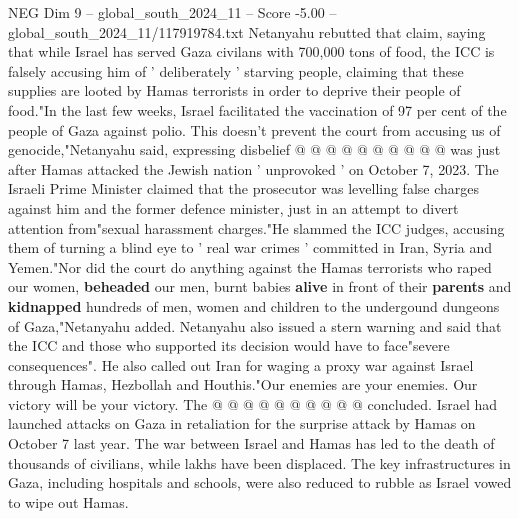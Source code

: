 \begin{textsample}{NEG Dim 9 – global\_south\_2024\_11 – Score -5.00 – global\_south\_2024\_11/117919784.txt}
Netanyahu rebutted that claim, saying that while Israel has served Gaza civilans with 700,000 tons of food, the ICC is falsely accusing him of ' deliberately ' starving people, claiming that these supplies are looted by Hamas terrorists in order to deprive their people of food."In the last few weeks, Israel facilitated the vaccination of 97 per cent of the people of Gaza against polio.
This doesn't prevent the court from accusing us of genocide,"Netanyahu said, expressing disbelief @ @ @ @ @ @ @ @ @ @ was just after Hamas attacked the Jewish nation ' unprovoked ' on October 7, 2023.
The Israeli Prime Minister claimed that the prosecutor was levelling false charges against him and the former defence minister, just in an attempt to divert attention from"sexual harassment charges."He slammed the ICC judges, accusing them of turning a blind eye to ' real war crimes ' committed in Iran, Syria and Yemen."Nor did the court do anything against the Hamas terrorists who raped our women, \textbf{beheaded} our men, burnt babies \textbf{alive} in front of their \textbf{parents} and \textbf{kidnapped} hundreds of men, women and children to the undergound dungeons of Gaza,"Netanyahu added.
Netanyahu also issued a stern warning and said that the ICC and those who supported its decision would have to face"severe consequences".
He also called out Iran for waging a proxy war against Israel through Hamas, Hezbollah and Houthis."Our enemies are your enemies.
Our victory will be your victory.
The @ @ @ @ @ @ @ @ @ @ concluded.
Israel had launched attacks on Gaza in retaliation for the surprise attack by Hamas on October 7 last year.
The war between Israel and Hamas has led to the death of thousands of civilians, while lakhs have been displaced.
The key infrastructures in Gaza, including hospitals and schools, were also reduced to rubble as Israel vowed to wipe out Hamas.

\end{textsample}
